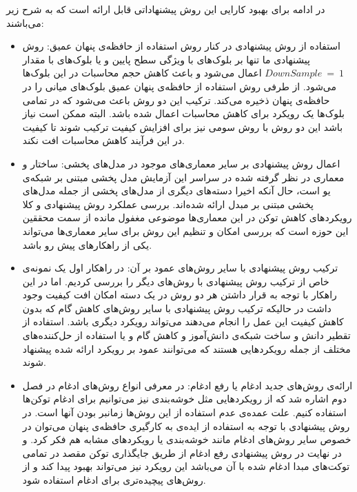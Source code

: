 در ادامه برای بهبود کارایی این روش پیشنهاداتی قابل ارائه است که به شرح زیر می‌باشند:
\begin{itemize}
	\item استفاده از روش پیشنهادی در کنار روش استفاده از حافظه‌ی پنهان عمیق: روش پیشنهادی ما تنها بر بلوک‌های با ویژگی سطح پایین و یا بلوک‌های با مقدار  $DownSample\ =\ 1$ اعمال می‌شود و باعث کاهش حجم محاسبات در این بلوک‌ها می‌شود. از طرفی روش استفاده از حافظه‌ی پنهان عمیق بلوک‌های میانی را در حافظه‌ی پنهان ذخیره می‌کند. ترکیب این دو روش باعث می‌شود که در تمامی بلوک‌ها یک رویکرد برای کاهش محاسبات اعمال شده باشد. البته ممکن است نیاز باشد این دو روش با روش سومی نیز برای افزایش کیفیت ترکیب شوند تا کیفیت در این فرآیند کاهش محاسبات افت نکند.
	
	\item اعمال روش پیشنهادی بر سایر معماری‌های موجود در مدل‌های پخشی: ساختار و معماری در نظر گرفته شده در سراسر این آزمایش مدل پخشی مبتنی بر شبکه‌ی یو است، حال آنکه اخیرا دسته‌های دیگری از مدل‌های پخشی از جمله مدل‌های پخشی مبتنی بر مبدل ارائه شده‌اند. بررسی عملکرد روش پیشنهادی و کلا رویکرد‌های کاهش توکن در این معماری‌ها موضوعی  مغفول مانده از سمت محققین این حوزه است که بررسی امکان و تنظیم این روش برای سایر معماری‌ها می‌تواند یکی از راهکار‌های پیش رو باشد.
	
	\item ترکیب روش پیشنهادی با سایر روش‌های عمود بر آن: در راهکار اول یک نمونه‌ی خاص از ترکیب روش پیشنهادی با روش‌های دیگر را بررسی کردیم. اما در این راهکار با توجه به قرار داشتن هر دو روش در یک دسته امکان افت کیفیت وجود داشت در حالیکه ترکیب روش پیشنهادی با سایر روش‌های کاهش گام که بدون کاهش کیفیت این عمل را انجام می‌دهند می‌تواند رویکرد دیگری باشد. استفاده از تقطیر دانش و ساخت شبکه‌ی دانش‌آموز و کاهش گام و یا استفاده از حل‌کننده‌های مختلف از جمله رویکرد‌هایی هستند که می‌توانند عمود بر رویکرد ارائه شده پیشنهاد شوند.
	
	\item ارائه‌ی روش‌های جدید ادغام یا رفع ادغام: در معرفی انواع روش‌های ادغام در فصل دوم اشاره شد که از رویکرد‌هایی مثل خوشه‌بندی نیز می‌توانیم برای ادغام توکن‌ها استفاده کنیم. علت عمده‌ی عدم استفاده از این روش‌ها زمانبر بودن آنها است. در روش پیشنهادی با توجه به استفاده از ایده‌ی به کارگیری حافظه‌ی پنهان می‌توان در خصوص سایر روش‌های ادغام مانند خوشه‌بندی یا رویکرد‌های مشابه هم فکر کرد. و در نهایت در روش پیشنهادی رفع ادغام از طریق جایگذاری توکن مقصد در تمامی توکت‌های مبدا ادغام شده با آن می‌باشد این رویکرد نیز می‌تواند بهبود پیدا کند و از روش‌های پیچیده‌تری برای ادغام استفاده شود.
	
\end{itemize}










